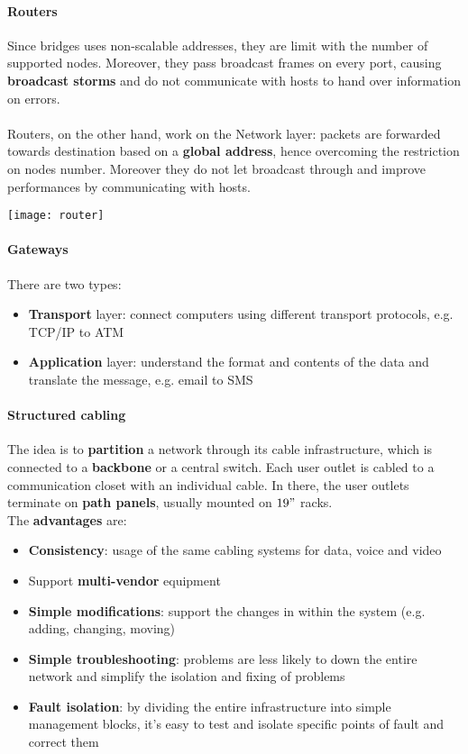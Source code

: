 \paragraph{Routers} Since bridges uses non-scalable addresses, they are limit with the number of supported nodes. Moreover, they pass broadcast frames on every port, causing \textbf{broadcast storms} and do not communicate with hosts to hand over information on errors.\\\\
Routers, on the other hand, work on the Network layer: packets are forwarded towards destination based on a \textbf{global address}, hence overcoming the restriction on nodes number. Moreover they do not let broadcast through and improve performances by communicating with hosts.
\begin{center}
	\texttt{[image: router]}
\end{center}

\paragraph{Gateways} There are two types:
\begin{itemize}
	\item \textbf{Transport} layer: connect computers using different transport protocols, e.g. TCP/IP to ATM
	\item \textbf{Application} layer: understand the format and contents of the data and translate the message, e.g. email to SMS
\end{itemize}

\paragraph{Structured cabling} The idea is to \textbf{partition} a network through its cable infrastructure, which is connected to a \textbf{backbone} or a central switch. Each user outlet is cabled to a communication closet with an individual cable. In there, the user outlets terminate on \textbf{path panels}, usually mounted on $19"$ racks.\\
The \textbf{advantages} are:
\begin{itemize}
	\item \textbf{Consistency}: usage of the same cabling systems for data, voice and video
	\item Support \textbf{multi-vendor} equipment
	\item \textbf{Simple modifications}: support the changes in within the system (e.g. adding, changing, moving)
	\item \textbf{Simple troubleshooting}: problems are less likely to down the entire network and simplify the isolation and fixing of problems
	\item \textbf{Fault isolation}: by dividing the entire infrastructure into simple management blocks, it's easy to test and isolate specific points of fault and correct them
\end{itemize}

